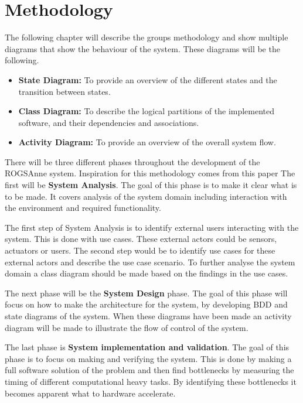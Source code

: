 
\chapter{Methodology}
The following chapter will describe the groups methodology and show multiple diagrams that show the behaviour of the system. These diagrams will be the following.

\begin{itemize}
	\item \textbf{State Diagram:} To provide an overview of the different states and the transition between states.
	
	\item \textbf{Class Diagram:} To describe the logical partitions of the implemented software, and their dependencies and associations.
	
	\item \textbf{Activity Diagram:} To provide an overview of the overall system flow.
\end{itemize}

There will be three different phases throughout the development of the ROGSAnne system. Inspiration for this methodology comes from this paper \cite{A_HW_SW_CodesignMethodology} The first will be \textbf{System Analysis}. The goal of this phase is to make it clear what is to be made. It covers analysis of the system domain including interaction with the environment and required functionality.

The first step of System Analysis is to identify external users interacting with the system. This is done with use cases. These external actors could be sensors, actuators or users. The second step would be to identify use cases for these external actors and describe the use case scenario. 
To further analyse the system domain a class diagram should be made based on the findings in the use cases.

The next phase will be the \textbf{System Design} phase. The goal of this phase will focus on how to make the architecture for the system, by developing BDD and state diagrams of the system. When these diagrams have been made an activity diagram will be made to illustrate the flow of control of the system.

The last phase is \textbf{System implementation and validation}. The goal of this phase is to focus on making and verifying the system. This is done by making a full software solution of the problem and then find bottlenecks by measuring the timing of different computational heavy tasks. By identifying these bottlenecks it becomes apparent what to hardware accelerate. 